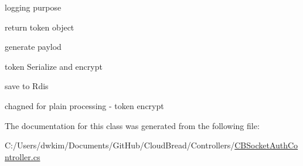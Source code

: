 logging purpose

return token object

generate paylod

token Serialize and encrypt

save to Rdis

chagned for plain processing -\/ token encrypt 

The documentation for this class was generated from the following file\+:\begin{DoxyCompactItemize}
\item 
C\+:/\+Users/dwkim/\+Documents/\+Git\+Hub/\+Cloud\+Bread/\+Controllers/\hyperlink{a00153}{C\+B\+Socket\+Auth\+Controller.\+cs}\end{DoxyCompactItemize}
